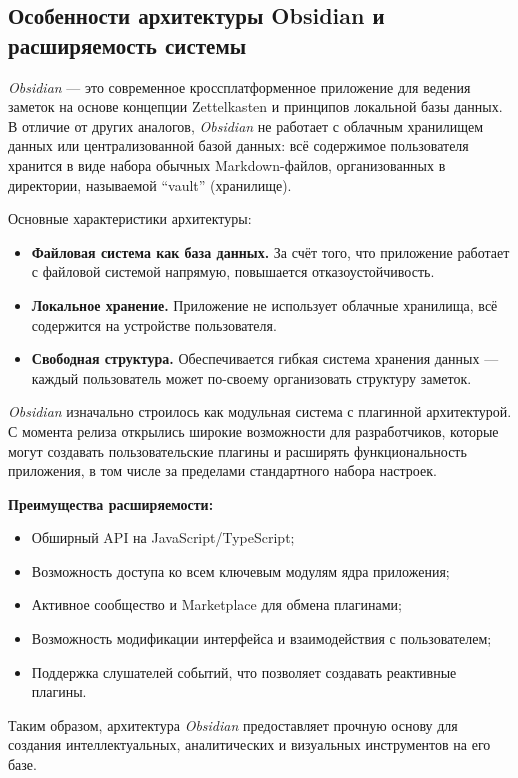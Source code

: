 \documentclass[14pt]{extarticle}
\begin{document}
\subsection{Особенности архитектуры Obsidian и расширяемость системы}

\textit{Obsidian} — это современное кроссплатформенное приложение для ведения заметок на основе концепции Zettelkasten и принципов локальной базы данных. В отличие от других аналогов, \textit{Obsidian} не работает с облачным хранилищем данных или централизованной базой данных: всё содержимое пользователя хранится в виде набора обычных Markdown-файлов, организованных в директории, называемой ``vault'' (хранилище).

Основные характеристики архитектуры:

\begin{itemize}
    \item \textbf{Файловая система как база данных.} За счёт того, что приложение работает с файловой системой напрямую, повышается отказоустойчивость.
    \item \textbf{Локальное хранение.} Приложение не использует облачные хранилища, всё содержится на устройстве пользователя.
    \item \textbf{Свободная структура.} Обеспечивается гибкая система хранения данных — каждый пользователь может по-своему организовать структуру заметок.
\end{itemize}

\textit{Obsidian} изначально строилось как модульная система с плагинной архитектурой. С момента релиза открылись широкие возможности для разработчиков, которые могут создавать пользовательские плагины и расширять функциональность приложения, в том числе за пределами стандартного набора настроек.

\textbf{Преимущества расширяемости:}
\begin{itemize}
    \item Обширный API на JavaScript/TypeScript;
    \item Возможность доступа ко всем ключевым модулям ядра приложения;
    \item Активное сообщество и Marketplace для обмена плагинами;
    \item Возможность модификации интерфейса и взаимодействия с пользователем;
    \item Поддержка слушателей событий, что позволяет создавать реактивные плагины.
\end{itemize}

Таким образом, архитектура \textit{Obsidian} предоставляет прочную основу для создания интеллектуальных, аналитических и визуальных инструментов на его базе.
\end{document}
